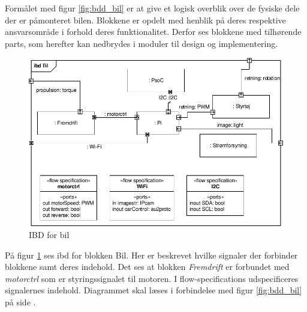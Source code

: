 \clearpage

Formålet med figur \ref{fig:bdd_bil} er at give et logisk overblik over de fysiske dele der er påmonteret bilen. 
Blokkene er opdelt med henblik på deres respektive ansvarsområde i forhold deres funktionalitet. Derfor ses blokkene med tilhørende parts, som herefter kan nedbrydes i moduler til design og implementering.

\begin{figure}[H]
\centering
\includegraphics[width=\textwidth]{../fig/diagrammer/bil/ibd_bil.pdf}
\caption{IBD for bil}
\label{fig:ibd_bil}
\end{figure} 

På figur \ref{fig:ibd_bil} ses ibd for blokken Bil. 
Her er beskrevet hvilke signaler der forbinder blokkene samt deres indehold. 
Det ses at blokken \emph{Fremdrift} er forbundet med \emph{motorctrl} som er styringssignalet til motoren.  
I flow-specifications udspecificeres signalernes indehold. 
Diagrammet skal læses i forbindelse med figur \ref{fig:bdd_bil} på side \pageref{fig:bdd_bil}. 

\clearpage